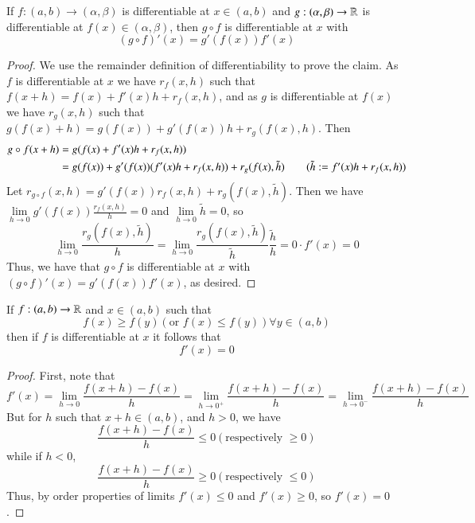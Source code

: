 \begin{subappendices}
    \begin{prop}
        If $f:(a,b)\rightarrow (\alpha,\beta)$ is differentiable at $x \in (a,b)$ and $g:(\alpha,\beta)\rightarrow \mathbb R$ is differentiable at $f(x) \in (\alpha,\beta)$, then $g\circ f$ is differentiable at $x$ with \begin{equation*}
            (g\circ f)'(x) = g'(f(x))f'(x)
        \end{equation*}
    \end{prop}
    \begin{proof}
        We use the remainder definition of differentiability to prove the claim. As $f$ is differentiable at $x$ we have $r_f(x,h)$ such that $f(x+h) = f(x) + f'(x)h + r_f(x,h)$, and as $g$ is differentiable at $f(x)$ we have $r_g(x,h)$ such that $g(f(x)+h) = g(f(x)) + g'(f(x))h + r_g(f(x),h)$. Then \begin{align*}
            g\circ f(x+h) &= g(f(x)+f'(x)h+r_f(x,h)) \\
            &= g(f(x)) + g'(f(x))(f'(x)h+r_f(x,h)) + r_g(f(x),\tilde{h}) \tag{$\tilde{h}:= f'(x)h+r_f(x,h)$} 
        \end{align*}
        Let $r_{g\circ f}(x,h) = g'(f(x))r_f(x,h) + r_g(f(x),\tilde{h})$. Then we have $\lim\limits_{h\rightarrow 0}g'(f(x))\frac{r_f(x,h)}{h} = 0$ and $\lim\limits_{h\rightarrow 0}\tilde{h} = 0$, so $$\lim\limits_{h\rightarrow 0}\frac{r_g(f(x),\tilde{h})}{h} = \lim\limits_{h\rightarrow 0}\frac{r_g(f(x),\tilde{h})}{\tilde{h}}\frac{\tilde{h}}{h} = 0\cdot f'(x) = 0$$ Thus, we have that $g\circ f$ is differentiable at $x$ with $(g\circ f)'(x) = g'(f(x))f'(x)$, as desired.
    \end{proof}

    \begin{prop}\label{prop:4.1.1}
        If $f:(a,b)\rightarrow \mathbb R$ and $x \in (a,b)$ such that \begin{equation*}
            f(x) \geq f(y) (\text{or }f(x) \leq f(y))\forall y \in (a,b)
        \end{equation*}
        then if $f$ is differentiable at $x$ it follows that $$f'(x) = 0$$
    \end{prop}
    \begin{proof}
        First, note that $$f'(x) = \lim\limits_{h\rightarrow 0}\frac{f(x+h)-f(x)}{h} = \lim\limits_{h\rightarrow 0^+}\frac{f(x+h) - f(x)}{h} = \lim\limits_{h\rightarrow 0^-}\frac{f(x+h)-f(x)}{h}$$ But for $h$ such that $x+h \in (a,b)$, and $h > 0$, we have $$\frac{f(x+h) - f(x)}{h} \leq 0 (\text{respectively } \geq 0)$$ while if $h < 0$, $$\frac{f(x+h) - f(x)}{h} \geq 0 (\text{respectively }\leq 0)$$ Thus, by order properties of limits $f'(x) \leq 0$ and $f'(x) \geq 0$, so $f'(x) = 0$.
    \end{proof}


\end{subappendices}
